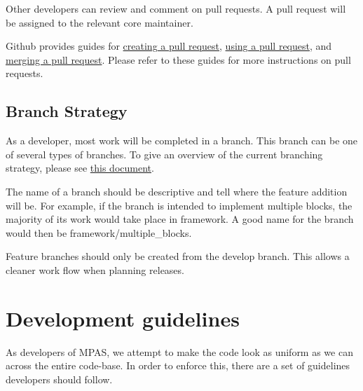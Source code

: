 \documentclass[11pt]{report}
\begin{document}
Other developers can review and comment on pull requests. A pull request will
be assigned to the relevant core maintainer.

Github provides guides for
\href{https://help.github.com/articles/creating-a-pull-request}{creating a pull
request}, \href{https://help.github.com/articles/using-pull-requests}{using a
pull request}, and
\href{https://help.github.com/articles/merging-a-pull-request}{merging a pull
request}. Please refer
to these guides for more instructions on pull requests.

\section{Branch Strategy}
\label{sec:branches}
As a developer, most work will be completed in a branch. This branch can be one
of several types of branches. To give an overview of the current branching
strategy, please see
\href{http://nvie.com/posts/a-successful-git-branching-model/}{this document}. 

The name of a branch should be descriptive and tell where the feature addition
will be. For example, if the branch is intended to implement multiple blocks,
the majority of its work would take place in framework. A good name for the
branch would then be framework/multiple\_blocks.

Feature branches should only be created from the develop branch. This allows a
cleaner work flow when planning releases.

\chapter{Development guidelines}
\label{chap:code-guidelines}
As developers of MPAS, we attempt to make the code look as uniform as we can
across the entire code-base. In order to enforce this, there are a set of
guidelines developers should follow.
\end{document}

